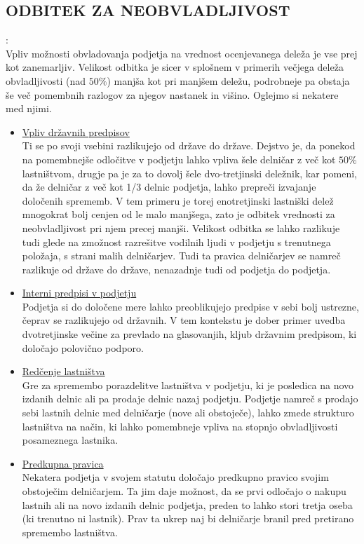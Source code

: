 \documentclass[12pt,a4paper]{amsart}
\theoremstyle{definition} %
\theoremstyle{plain} %
\begin{document}
\subsection {ODBITEK ZA NEOBVLADLJIVOST}:\\

Vpliv možnosti obvladovanja podjetja na vrednost ocenjevanega deleža je vse prej kot zanemarljiv. Velikost odbitka je sicer v splošnem v primerih večjega deleža obvladljivosti (nad $50\%$) manjša kot pri manjšem deležu, podrobneje pa obstaja še več pomembnih razlogov za njegov nastanek in višino. Oglejmo si nekatere med njimi.
\begin{itemize}
\item\underline{ Vpliv državnih predpisov}\\
Ti se po svoji vsebini razlikujejo od države do države. Dejstvo je, da ponekod na pomembnejše odločitve v podjetju lahko vpliva šele delničar z več kot $50\%$ lastništvom, drugje pa je za to dovolj šele dvo-tretjinski deležnik, kar pomeni, da že delničar z več kot 1/3 delnic podjetja, lahko prepreči izvajanje določenih sprememb. V tem primeru je torej enotretjinski lastniški delež mnogokrat bolj cenjen od le malo manjšega, zato je odbitek vrednosti za neobvladljivost pri njem precej manjši. Velikost odbitka se lahko razlikuje tudi glede na zmožnost razrešitve vodilnih ljudi v podjetju s trenutnega položaja, s strani malih delničarjev. Tudi ta pravica delničarjev se namreč razlikuje od države do države, nenazadnje tudi od podjetja do podjetja.
\item\underline{ Interni predpisi v podjetju}\\
Podjetja si do določene mere lahko preoblikujejo predpise v sebi bolj ustrezne, čeprav se razlikujejo od državnih. V tem kontekstu je dober primer uvedba dvotretjinske večine za prevlado na glasovanjih, kljub državnim predpisom, ki določajo polovično podporo. 
\item\underline{ Redčenje lastništva}\\
Gre za spremembo porazdelitve lastništva v podjetju, ki je posledica na novo izdanih delnic ali pa prodaje delnic nazaj podjetju. Podjetje namreč s prodajo sebi lastnih delnic med delničarje (nove ali obstoječe), lahko zmede strukturo lastništva na način, ki lahko pomembneje vpliva na stopnjo obvladljivosti posameznega lastnika. 
\item\underline{Predkupna pravica}\\
Nekatera podjetja v svojem statutu določajo predkupno pravico svojim obstoječim delničarjem. Ta jim daje možnost, da se prvi odločajo o nakupu lastnih ali na novo izdanih delnic podjetja, preden to lahko stori tretja oseba (ki trenutno ni lastnik). Prav ta ukrep naj bi delničarje branil pred pretirano spremembo lastništva. 

\end{itemize}
\end{document}
